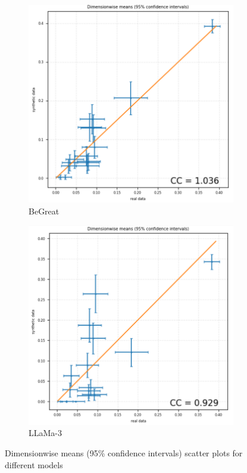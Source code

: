 \begin{figure}[H]
\begin{subfigure}[b]{0.45\textwidth}
        \includegraphics[width=\textwidth]{images/avg_dim_begreat.png}
        \caption{BeGreat}
        \label{fig:avg_dim_begreat}
    \end{subfigure}
    \hfill
    \begin{subfigure}[b]{0.48\textwidth}
        \centering
        \includegraphics[width=\textwidth]{images/avg_dim_llama.png}
        \caption{LLaMa-3}
        \label{fig:avg_dim_llama}
    \end{subfigure}
    \caption{Dimensionwise means (95\% confidence intervals) scatter plots for different models}
    \label{fig:dim_means_distrib}
\end{figure}

